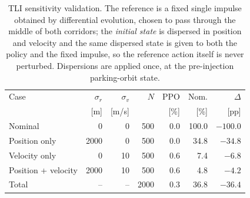 \begin{table}[hbt!]
\centering
\small
\caption{TLI sensitivity validation. The reference is a fixed single impulse obtained by differential evolution, chosen to pass through the middle of both corridors; the \emph{initial state} is dispersed in position and velocity and the same dispersed state is given to both the policy and the fixed impulse, so the reference action itself is never perturbed. Dispersions are applied once, at the pre-injection parking-orbit state.}
\label{tab:tli_sensitivity}
\begin{tabular}{lrrrrrr}
\toprule
Case & $\sigma_r$ & $\sigma_v$ & $N$ & PPO & Nom. & $\Delta$ \\
 & [m] & [m/s] & & [\%] & [\%] & [pp] \\
\midrule
Nominal & 0 & 0 & 500 & 0.0 & 100.0 & $-100.0$ \\
Position only & 2000 & 0 & 500 & 0.0 & 34.8 & $-34.8$ \\
Velocity only & 0 & 10 & 500 & 0.6 & 7.4 & $-6.8$ \\
Position + velocity & 2000 & 10 & 500 & 0.6 & 4.8 & $-4.2$ \\
\midrule
Total & -- & -- & 2000 & 0.3 & 36.8 & $-36.4$ \\
\bottomrule
\end{tabular}
\end{table}